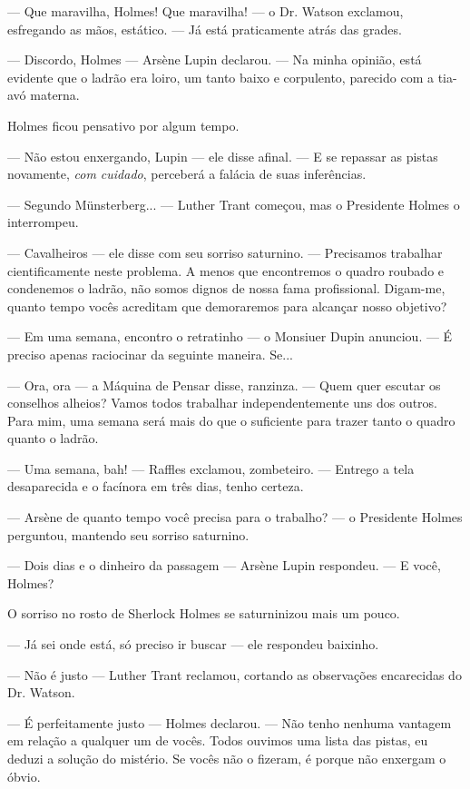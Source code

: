 --- Que maravilha, Holmes! Que maravilha! --- o Dr. Watson exclamou,
esfregando as mãos, estático. --- Já está praticamente atrás das grades.

--- Discordo, Holmes --- Arsène Lupin declarou. --- Na minha opinião,
está evidente que o ladrão era loiro, um tanto baixo e corpulento,
parecido com a tia-avó materna.

Holmes ficou pensativo por algum tempo.

--- Não estou enxergando, Lupin --- ele disse afinal. --- E se repassar
as pistas novamente, \emph{com cuidado}, perceberá a falácia de suas
inferências.

--- Segundo Münsterberg... --- Luther Trant começou, mas o Presidente
Holmes o interrompeu.

--- Cavalheiros --- ele disse com seu sorriso saturnino. --- Precisamos
trabalhar cientificamente neste problema. A menos que encontremos o
quadro roubado e condenemos o ladrão, não somos dignos de nossa fama
profissional. Digam-me, quanto tempo vocês acreditam que demoraremos
para alcançar nosso objetivo?

--- Em uma semana, encontro o retratinho --- o Monsiuer Dupin anunciou.
--- É preciso apenas raciocinar da seguinte maneira. Se...

--- Ora, ora --- a Máquina de Pensar disse, ranzinza. --- Quem quer
escutar os conselhos alheios? Vamos todos trabalhar independentemente
uns dos outros. Para mim, uma semana será mais do que o suficiente para
trazer tanto o quadro quanto o ladrão.

--- Uma semana, bah! --- Raffles exclamou, zombeteiro. --- Entrego a
tela desaparecida e o facínora em três dias, tenho certeza.

--- Arsène de quanto tempo você precisa para o trabalho? --- o
Presidente Holmes perguntou, mantendo seu sorriso saturnino.

--- Dois dias e o dinheiro da passagem --- Arsène Lupin respondeu. --- E
você, Holmes?

O sorriso no rosto de Sherlock Holmes se saturninizou mais um pouco.

--- Já sei onde está, só preciso ir buscar --- ele respondeu baixinho.

--- Não é justo --- Luther Trant reclamou, cortando as observações
encarecidas do Dr. Watson.

--- É perfeitamente justo --- Holmes declarou. --- Não tenho nenhuma
vantagem em relação a qualquer um de vocês. Todos ouvimos uma lista das
pistas, eu deduzi a solução do mistério. Se vocês não o fizeram, é
porque não enxergam o óbvio.

